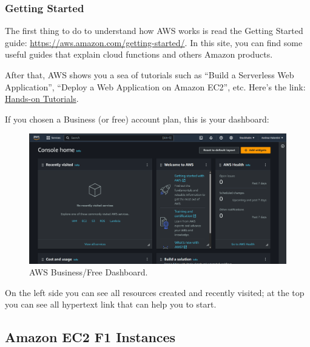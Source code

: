 \documentclass[a4paper]{article}
\newcommand{\dquotes}[1]{``#1''}
\begin{document}
    \newpage

    \subsubsection{Getting Started}

    The first thing to do to understand how AWS works is read the Getting Started guide: \url{https://aws.amazon.com/getting-started/}. In this site, you can find some useful guides that explain cloud functions and others Amazon products.\newline

    \noindent
    After that, AWS shows you a sea of tutorials such as \dquotes{Build a Serverless Web Application}, \dquotes{Deploy a Web Application on Amazon EC2}, etc. Here's the link: \href{https://aws.amazon.com/getting-started/hands-on/?pg=gs&sec=lyfa&getting-started-all.sort-by=item.additionalFields.content-latest-publish-date&getting-started-all.sort-order=desc&awsf.getting-started-category=*all&awsf.getting-started-content-type=*all}{Hands-on Tutorials}.\newline

    \noindent
    If you chosen a Business (or free) account plan, this is your dashboard:
    \begin{figure}[!htp]
        \centering
        \includegraphics[width=\textwidth]{img/business-free_dashboard.png}
        \caption{AWS Business/Free Dashboard.}
    \end{figure}

    \noindent
    On the left side you can see all resources created and recently visited; at the top you can see all hypertext link that can help you to start.\newpage

    \subsection{Amazon EC2 F1 Instances}
\end{document}
